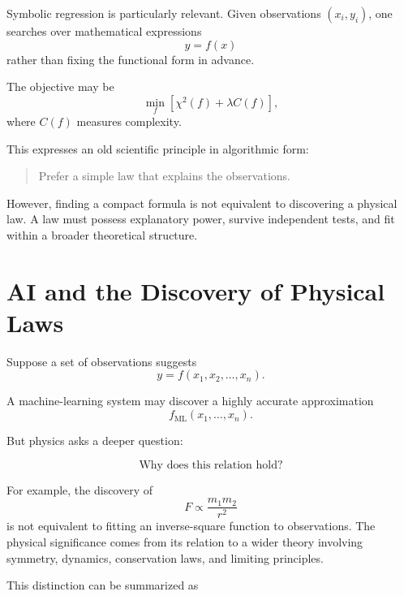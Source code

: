 \documentclass[11pt,a4paper]{article}
\begin{document}
Symbolic regression is particularly relevant. Given observations
$(x_i,y_i)$, one searches over mathematical expressions
\begin{equation}
y=f(x)
\end{equation}
rather than fixing the functional form in advance.

The objective may be
\begin{equation}
\min_f
\left[
\chi^2(f)+\lambda C(f)
\right],
\end{equation}
where $C(f)$ measures complexity.

This expresses an old scientific principle in algorithmic form:

\begin{quote}
Prefer a simple law that explains the observations.
\end{quote}

However, finding a compact formula is not equivalent to discovering a physical
law. A law must possess explanatory power, survive independent tests, and fit
within a broader theoretical structure.

\section{AI and the Discovery of Physical Laws}

Suppose a set of observations suggests
\begin{equation}
y=f(x_1,x_2,\ldots,x_n).
\end{equation}

A machine-learning system may discover a highly accurate approximation
\begin{equation}
f_{\mathrm{ML}}(x_1,\ldots,x_n).
\end{equation}

But physics asks a deeper question:

\begin{equation}
\text{Why does this relation hold?}
\end{equation}

For example, the discovery of
\begin{equation}
F\propto\frac{m_1m_2}{r^2}
\end{equation}
is not equivalent to fitting an inverse-square function to observations. The
physical significance comes from its relation to a wider theory involving
symmetry, dynamics, conservation laws, and limiting principles.

This distinction can be summarized as
\end{document}
